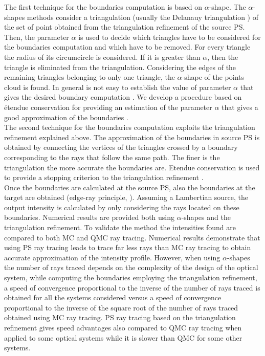The first technique for the boundaries computation is based on $\alpha$-shape. 
The $\alpha$-shapes methods consider a triangulation (usually the Delanauy triangulation \cite{marsden2003texts}) of the set of point obtained from the triangulation refinement of the source PS. Then, the parameter $\alpha$ is used to decide which triangles have to be considered for the boundaries computation and which have to be removed. For every triangle the radius of its circumcircle is considered. If it is greater than $\alpha$, then the triangle is eliminated from the triangulation. Considering the edges of the remaining triangles belonging to only one triangle, the $\alpha$-shape of the points cloud is found. In general is not easy to establish the value of parameter $\alpha$ that gives the desired boundary computation \cite{teichmann1998surface}. We develop a procedure based on \'{e}tendue conservation for providing an estimation of the parameter $\alpha$ that gives a good approximation of the boundaries \cite{filosa2015new}. \\ \indent The second technique for the boundaries computation exploits the triangulation refinement explained above. The approximation of the boundaries in source PS is obtained by connecting the vertices of the triangles crossed by a boundary corresponding to the rays that follow the same path. The finer is the triangulation the more accurate the boundaries are. Etendue conservation is used to provide a stopping criterion to the triangulation refinement \cite{filosa2016ray, filosa2017phase}. \\ \indent  
Once the boundaries are calculated at the source PS, also the boundaries at the target are obtained (edge-ray principle, \cite{Ries:2}). Assuming a Lambertian source, the output intensity is calculated by only considering the rays located on these boundaries. Numerical results are provided both using $\alpha$-shapes and the triangulation refinement. To validate the method the intensities found are compared to both MC and QMC ray tracing. Numerical results demonstrate that using PS ray tracing leads to trace far less rays than MC ray tracing to obtain accurate approximation of the intensity profile. However, when using $\alpha$-shapes the number of rays traced depends on the complexity of the design of the optical system, while computing the boundaries employing the triangulation refinement, a speed of convergence proportional to the inverse of the number of rays traced is obtained for all the systems considered versus a speed of convergence proportional to the inverse of the square root of the number of rays traced obtained using MC ray tracing. PS ray tracing based on the triangulation refinement gives speed advantages also compared to QMC ray tracing when applied to some optical systems while it is slower than QMC for some other systems.

